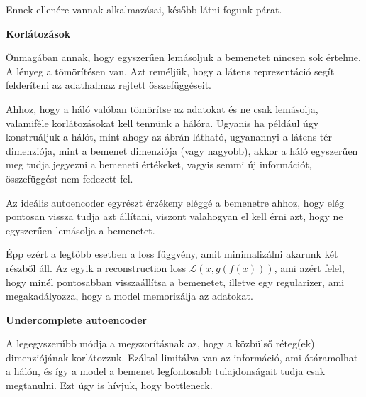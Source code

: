 \documentclass[12pt]{amsart}
\begin{document}
\vspace{5pt}

Ennek ellenére vannak alkalmazásai, később látni fogunk
párat. 

\vspace{10pt}

\textbf{Korlátozások}

\vspace{10pt}

Önmagában annak, hogy egyszerűen lemásoljuk a bemenetet
nincsen sok értelme. A lényeg a tömörítésen van. Azt
reméljük, hogy a látens reprezentáció segít felderíteni az
adathalmaz rejtett összefüggéseit.

\vspace{5pt}

Ahhoz, hogy a háló valóban tömörítse az adatokat és ne csak
lemásolja, valamiféle korlátozásokat kell tennünk a
hálóra. Ugyanis ha például úgy konstruáljuk a hálót, mint
ahogy az ábrán látható, ugyanannyi a látens tér dimenziója,
mint a bemenet dimenziója (vagy nagyobb), akkor a háló
egyszerűen meg tudja jegyezni a bemeneti értékeket, vagyis
semmi új információt, összefüggést nem fedezett fel. 

\vspace{5pt}

Az ideális autoencoder egyrészt érzékeny eléggé a bemenetre
ahhoz, hogy elég pontosan vissza tudja azt állítani, viszont
valahogyan el kell érni azt, hogy ne egyszerűen lemásolja a
bemenetet. 

\vspace{5pt}

Épp ezért a legtöbb esetben a loss függvény, amit
minimalizálni akarunk két részből áll. Az egyik a
reconstruction loss $\mathcal{L}(x, g(f(x)))$, ami azért
felel, hogy minél pontosabban visszaállítsa a bemenetet,
illetve egy regularizer, ami megakadályozza, hogy a model
memorizálja az adatokat.

\vspace{10pt}

\textbf{Undercomplete autoencoder}

\vspace{10pt}

A legegyszerűbb módja a megszorításnak az, hogy a közbülső
réteg(ek) dimenziójának korlátozzuk. Ezáltal limitálva van
az információ, ami átáramolhat a hálón, és így a model a
bemenet legfontosabb tulajdonságait tudja csak
megtanulni. Ezt úgy is hívjuk, hogy bottleneck. 

\vspace{5pt}
\end{document}
